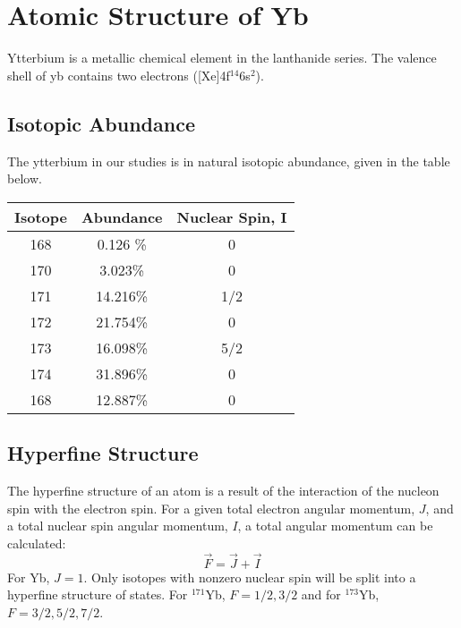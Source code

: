 \documentclass[12pt, a4paper]{article}
\begin{document}
\section{Atomic Structure of Yb}
Ytterbium is a metallic chemical element in the lanthanide series. The valence shell of yb contains two electrons ([Xe]4f$^{14}$6s$^{2}$).
\subsection{Isotopic Abundance}
The ytterbium in our studies is in natural isotopic abundance, given in the table below.
\begin{center}
\begin{tabular}{||c|c|c||}
\hline
Isotope & Abundance & Nuclear Spin, I\\
\hline \hline
168 & 0.126 \% & 0\\
\hline
170 & 3.023\% & 0 \\
\hline
171 & 14.216\% & 1/2 \\
\hline
172 & 21.754\% & 0 \\
\hline
173 & 16.098\% & 5/2 \\
\hline
174 & 31.896\% & 0 \\
\hline
168 & 12.887\% & 0 \\
\hline
\end{tabular}
\end{center}
\subsection{Hyperfine Structure}
The hyperfine structure of an atom is a result of the interaction of the nucleon spin with the electron spin. For a given total electron angular momentum, $J$, and a total nuclear spin angular momentum, $I$, a total angular momentum can be calculated:
\begin{equation}
\vec{F} = \vec{J} +\vec{I}
\end{equation}
For Yb, $J=1$. Only isotopes with nonzero nuclear spin will be split into a hyperfine structure of states. For $^{171}$Yb, $F=1/2,3/2$ and for $^{173}$Yb, $F=3/2,5/2,7/2$.
\end{document}
